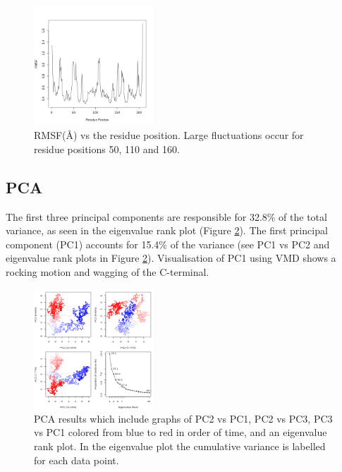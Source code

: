\documentclass[twocolumn]{bmcart}%
\begin{document}
\begin{figure}[ht!]
  \includegraphics[width=0.4\textwidth]{htmd_analysis_rmsf}
  \caption{
      RMSF(\AA) vs the residue position. Large fluctuations occur for residue positions 50, 110 and 160. }
\label{fig:rmsf}
\end{figure}

\subsection*{PCA}

The first three principal components are responsible for 32.8\% of the total variance, as seen in the eigenvalue rank plot (Figure \ref{fig:pca}). The first principal component (PC1) accounts for 15.4\% of the variance (see PC1 vs PC2 and eigenvalue rank plots in Figure \ref{fig:pca}). Visualisation of PC1 using VMD\cite{hump_vmd_1996} shows a rocking motion and wagging of the C-terminal.


\begin{figure}[ht!]
  \includegraphics[width=0.4\textwidth]{htmd_analysis_pca}
  \caption{
      PCA results which include graphs of PC2 vs PC1, PC2 vs PC3, PC3 vs PC1  colored from blue to red in order of time, and an eigenvalue rank plot. In the eigenvalue plot the cumulative variance is labelled for each data point.}
 \label{fig:pca}
 \end{figure}
\end{document}
